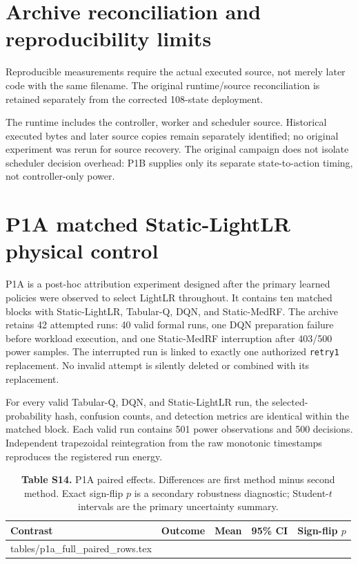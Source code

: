 \documentclass[10pt,a4paper]{article}
\makeatletter
\newcommand{\tableinput}[1]{\@@input #1.tex }
\makeatother
\begin{document}
\section{Archive reconciliation and reproducibility limits}
Reproducible measurements require the actual executed source, not merely later code with the same filename. The original runtime/source reconciliation is retained separately from the corrected 108-state deployment.

The runtime includes the controller, worker and scheduler source. Historical executed bytes and later source copies remain separately identified; no original experiment was rerun for source recovery. The original campaign does not isolate scheduler decision overhead: P1B supplies only its separate state-to-action timing, not controller-only power.

\section{P1A matched Static-LightLR physical control}
P1A is a post-hoc attribution experiment designed after the primary learned policies were observed to select LightLR throughout. It contains ten matched blocks with Static-LightLR, Tabular-Q, DQN, and Static-MedRF. The archive retains 42 attempted runs: 40 valid formal runs, one DQN preparation failure before workload execution, and one Static-MedRF interruption after 403/500 power samples. The interrupted run is linked to exactly one authorized \texttt{retry1} replacement. No invalid attempt is silently deleted or combined with its replacement.

For every valid Tabular-Q, DQN, and Static-LightLR run, the selected-probability hash, confusion counts, and detection metrics are identical within the matched block. Each valid run contains 501 power observations and 500 decisions. Independent trapezoidal reintegration from the raw monotonic timestamps reproduces the registered run energy.

\begin{table}[h!]
\centering\footnotesize
\caption*{\textbf{Table S14.} P1A paired effects. Differences are first method minus second method. Exact sign-flip $p$ is a secondary robustness diagnostic; Student-$t$ intervals are the primary uncertainty summary.}
\setlength{\tabcolsep}{3.2pt}
\begin{tabular}{llrrr}\toprule
Contrast & Outcome & Mean & 95\% CI & Sign-flip $p$\\\midrule
\tableinput{tables/p1a_full_paired_rows}
\bottomrule\end{tabular}
\end{table}
\end{document}
